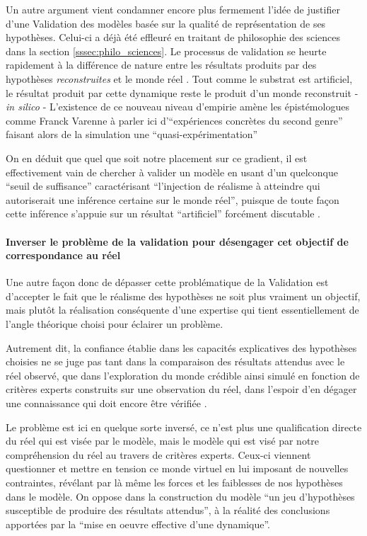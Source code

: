 Un autre argument vient condamner encore plus fermement l'idée de justifier d'une Validation des modèles basée sur la qualité de représentation de ses hypothèses. Celui-ci a déjà été effleuré en traitant de philosophie des sciences dans la section \ref{sssec:philo_sciences}. Le processus de validation se heurte rapidement à la différence de nature entre les résultats produits par des hypothèses \textit{reconstruites} et le monde réel . Tout comme le substrat est artificiel, le résultat produit par cette dynamique reste le produit d'un monde reconstruit - \textit{in silico} - L'existence de ce nouveau niveau d'empirie amène les épistémologues comme Franck Varenne à parler ici d'\enquote{expériences concrètes du second genre} faisant alors de la simulation une \enquote{quasi-expérimentation} \autocites{Varenne2001, Varenne2007, Phan2008, Phan2010}

On en déduit que quel que soit notre placement sur ce gradient, il est effectivement vain de chercher à valider un modèle en usant d'un quelconque \enquote{seuil de suffisance} caractérisant \enquote{l'injection de réalisme à atteindre qui autoriserait une inférence certaine sur le monde réel}, puisque de toute façon cette inférence s'appuie sur un résultat \enquote{artificiel} forcément discutable .

\paragraph{Inverser le problème de la validation pour désengager cet objectif de correspondance au réel}
\label{p:inverser_problematique}

Une autre façon donc de dépasser cette problématique de la Validation est d'accepter le fait que le réalisme des hypothèses ne soit plus vraiment un objectif, mais plutôt la réalisation conséquente d'une expertise qui tient essentiellement de l'angle théorique choisi pour éclairer un problème.

Autrement dit, la confiance établie dans les capacités explicatives des hypothèses choisies ne se juge pas tant dans la comparaison des résultats attendus avec le réel observé, que dans l'exploration du monde crédible ainsi simulé en fonction de critères experts construits sur une observation du réel, dans l'espoir d'en dégager une connaissance qui doit encore être vérifiée .

Le problème est ici en quelque sorte inversé, ce n'est plus une qualification directe du réel qui est visée par le modèle, mais le modèle qui est visé par notre compréhension du réel au travers de critères experts. Ceux-ci viennent questionner et mettre en tension ce monde virtuel en lui imposant de nouvelles contraintes, révélant par là même les forces et les faiblesses de nos hypothèses dans le modèle. On oppose dans la construction du modèle \enquote{un jeu d'hypothèses susceptible de produire des résultats attendus}, à la réalité des conclusions apportées par la \enquote{mise en oeuvre effective d'une dynamique}.

